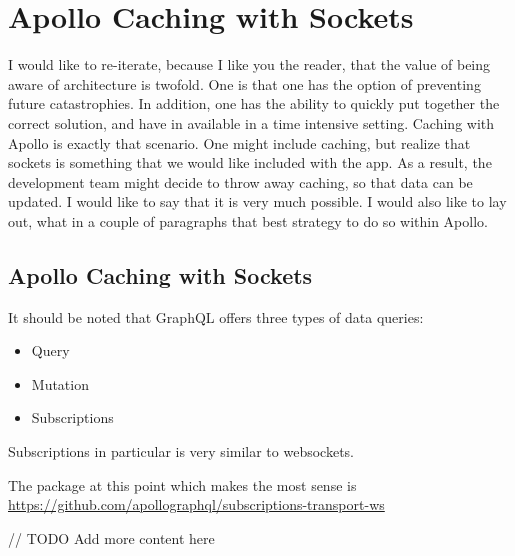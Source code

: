 \maketitle{}
\section{ Apollo Caching with Sockets }

I would like to re-iterate, because I like you the reader, that the value of
being aware of architecture is twofold. One is that one has the option of
preventing future catastrophies. In addition, one has the ability to quickly
put together the correct solution, and have in available in a time intensive
setting. Caching with Apollo is exactly that scenario. One might include
caching, but realize that sockets is something that we would like included with
the app. As a result, the development team might decide to throw away caching,
so that data can be updated. I would like to say that it is very much possible.
I would also like to lay out, what in a couple of paragraphs that best strategy
to do so within Apollo.

\subsection{ Apollo Caching with Sockets }

It should be noted that GraphQL offers three types of data queries:
\begin{itemize}
  \item Query
  \item Mutation
  \item Subscriptions
\end{itemize}

Subscriptions in particular is very similar to websockets. 

The package at this point which makes the most sense is
\href{subscriptions-transport-ws}{https://github.com/apollographql/subscriptions-transport-ws}

// TODO Add more content here
